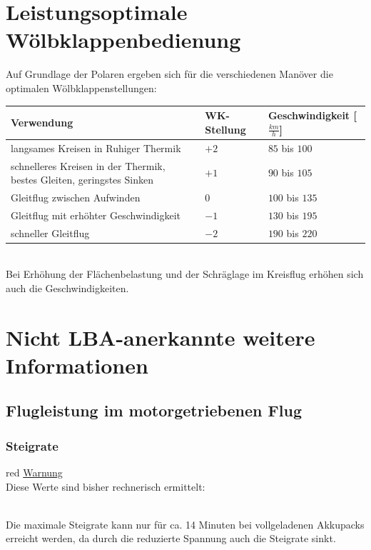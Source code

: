 \section{Leistungsoptimale Wölbklappenbedienung}
Auf Grundlage der Polaren ergeben sich für die verschiedenen Manöver die optimalen Wölbklappenstellungen:\\
\newline
\begin{tabular}{|m{}|m{2cm}|m{4cm}|}
\hline
Verwendung & WK-Stellung & Geschwindigkeit [$\unit{\frac{km}{h}}$]\\
\hline
langsames Kreisen in Ruhiger Thermik & $+2$ & $85$ bis $100$\\
\hline
schnelleres Kreisen in der Thermik, bestes Gleiten, geringstes Sinken & $+1$ & $90$ bis $105$\\
\hline
Gleitflug zwischen Aufwinden & $0$ & $100$ bis $135$\\
\hline
Gleitflug mit erhöhter Geschwindigkeit & $-1$ & $130$ bis $195$\\
\hline
schneller Gleitflug & $-2$ & $190$ bis $220$\\
\hline
\end{tabular}\\
\newline
\newline
Bei Erhöhung der Flächenbelastung und der Schräglage im Kreisflug erhöhen sich auch die Geschwindigkeiten.

\section{Nicht LBA-anerkannte weitere Informationen}
\subsection{Flugleistung im motorgetriebenen Flug}
\subsubsection{Steigrate}

\begin{color}{red}
\large{\underline{Warnung}}\\
Diese Werte sind bisher rechnerisch ermittelt:
\end{color}\\

Die maximale Steigrate kann nur für ca. 14 Minuten bei vollgeladenen Akkupacks erreicht werden, da durch die reduzierte Spannung auch die Steigrate sinkt.

